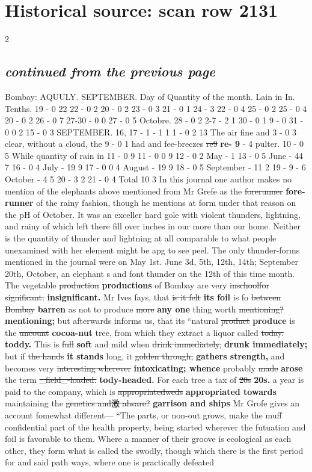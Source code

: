 \documentclass[10pt]{article}
\begin{document}
\section*{Historical source: scan row 2131}
\begin{multicols}{2}
\subsection*{\textit{continued from the previous page}}
Bombay: AQUULY. SEPTEMBER. Day of Quantity of the month. Lain in In. Tenths. 19 - 0 22 22 - 0 2 20 - 0 2 23 - 0 3 21 - 0 1 24 - 3 22 - 0 4 25 - 0 2 25 - 0 4 20 - 0 2 26 - 0 7 27-30 - 0 0 27 - 0 5 Octobre. 28 - 0 2 2-7 - 2 1 30 - 0 1 9 - 0 31 - 0 0 2 15 - 0 3 SEPTEMBER. 16, 17 - 1 - 1 1 1 - 0 2 13 The air fine and 3 - 0 3 clear, without a cloud, the 9 - 0 1 had and fee-breczes \sout{re9} \textbf{re- 9} - 4 pulter. 10 - 0 5 While quantity of rain in 11 - 0 9 11 - 0 0 9 12 - 0 2 May - 1 13 - 0 5 June - 44 7 16 - 0 4 July - 19 9 17 - 0 0 4 August - 19 9 18 - 0 5 September - 11 2 19 - 9 - 6 October - 4 5 20 - 3 2 21 - 0 4 Total 10 3 In this journal one author makes no mention of the elephants above mentioned from Mr Grefe as the \sout{forerunner} \textbf{fore-runner} of the rainy fashion, though he mentions at form under that reason on the pH of October. It was an exceller hard gole with violent thunders, lightning, and rainy of which left there fill over inches in our more than our home. Neither is the quantity of thunder and lightning at all comparable to what people unexamined with her element might be apg to see peel. The only thunder-forms mentioned in the journal were on May 1st. June 3d, 5th, 12th, 14th; September 20th, October, an elephant s and font thunder on the 12th of this time month. The vegetable \sout{production} \textbf{productions} of Bombay are very \sout{inschoolfor significant.} \textbf{insignificant.} Mr Ives fays, that \sout{is it felt} \textbf{its foil} is fo \sout{between Bombay} \textbf{barren} as not to produce \sout{more} \textbf{any one} thing worth \sout{mentioning?} \textbf{mentioning;} but afterwards informs us, that its “natural \sout{product} \textbf{produce} is the \sout{uncount} \textbf{cocoa-nut} tree, from which they extract a liquor called \sout{today.} \textbf{toddy.} This is \sout{full} \textbf{soft} and mild when \sout{drink immediately,} \textbf{drunk immediately;} but if \sout{the hands} \textbf{it stands} long, it \sout{golden through,} \textbf{gathers strength,} and becomes very \sout{interesting wherever} \textbf{intoxicating; whence} probably \sout{made} \textbf{arose} the term \sout{\_field\_-loaded.} \textbf{tody-headed.} For each tree a tax of \sout{20s} \textbf{20s.} a year is paid to the company, which is \sout{appropriatedweds} \textbf{appropriated towards} maintaining the \sout{genetics and激 alware?} \textbf{garrison and ships} Mr Grofe gives an account fomewhat different— “The parts, or non-out grows, make the muff confidential part of the health property, being started wherever the futuation and foil is favorable to them. Where a manner of their groove is ecological as each other, they form what is called the swodly, though which there is the first period for and said path ways, where one is practically defeated 
\end{multicols}
\end{document}

